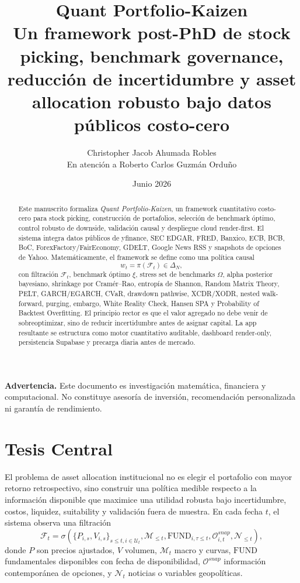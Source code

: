 \documentclass[11pt,letterpaper]{article}
\title{
  \textbf{Quant Portfolio-Kaizen}\\
  \large Un framework post-PhD de stock picking, benchmark governance, reducción de incertidumbre y asset allocation robusto bajo datos públicos costo-cero
}
\author{
  Christopher Jacob Ahumada Robles\\
  \small En atención a Roberto Carlos Guzmán Orduño
}
\date{Junio 2026}
\newcommand{\F}{\mathcal{F}}
\newcommand{\U}{\mathcal{U}}
\newcommand{\M}{\mathcal{M}}
\newcommand{\1}{\mathbbm{1}}
\begin{document}
\maketitle

\begin{abstract}
Este manuscrito formaliza \emph{Quant Portfolio-Kaizen}, un framework cuantitativo costo-cero para stock picking, construcción de portafolios, selección de benchmark óptimo, control robusto de downside, validación causal y despliegue cloud render-first. El sistema integra datos públicos de yfinance, SEC EDGAR, FRED, Banxico, ECB, BCB, BoC, ForexFactory/FairEconomy, GDELT, Google News RSS y snapshots de opciones de Yahoo. Matemáticamente, el framework se define como una política causal
\[
  w_t=\pi(\F_t)\in\Delta_N,
\]
con filtración \(\F_t\), benchmark óptimo \(\xi\), stress set de benchmarks \(\Omega\), alpha posterior bayesiano, shrinkage por Cramér--Rao, entropía de Shannon, Random Matrix Theory, PELT, GARCH/EGARCH, CVaR, drawdown pathwise, XCDR/XODR, nested walk-forward, purging, embargo, White Reality Check, Hansen SPA y Probability of Backtest Overfitting. El principio rector es que el valor agregado no debe venir de sobreoptimizar, sino de reducir incertidumbre antes de asignar capital. La app resultante se estructura como motor cuantitativo auditable, dashboard render-only, persistencia Supabase y precarga diaria antes de mercado.
\end{abstract}

\textbf{Advertencia.} Este documento es investigación matemática, financiera y computacional. No constituye asesoría de inversión, recomendación personalizada ni garantía de rendimiento.

\tableofcontents
\newpage

\section{Tesis Central}

El problema de asset allocation institucional no es elegir el portafolio con mayor retorno retrospectivo, sino construir una política medible respecto a la información disponible que maximice una utilidad robusta bajo incertidumbre, costos, liquidez, suitability y validación fuera de muestra. En cada fecha \(t\), el sistema observa una filtración
\[
\F_t =
\sigma\left(
\{P_{i,s},V_{i,s}\}_{s\le t,i\in\U_t},
\M_{\le t},
\mathrm{FUND}_{i,\tau\le t},
\mathcal{O}^{snap}_{i,t},
\mathcal{N}_{\le t}
\right),
\]
donde \(P\) son precios ajustados, \(V\) volumen, \(\M_t\) macro y curvas, \(\mathrm{FUND}\) fundamentales disponibles con fecha de disponibilidad, \(\mathcal{O}^{snap}\) información contemporánea de opciones, y \(\mathcal{N}_t\) noticias o variables geopolíticas.
\end{document}
